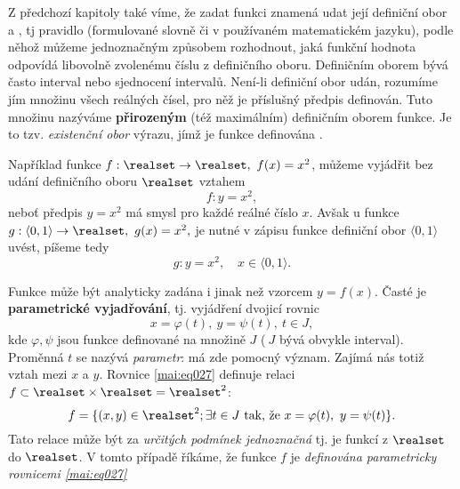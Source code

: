   
      Z předchozí kapitoly také víme, že zadat funkci znamená udat její definiční obor a 
      , tj pravidlo (formulované slovně či v používaném matematickém 
      jazyku), podle něhož můžeme jednoznačným způsobem rozhodnout, jaká funkční hodnota odpovídá 
      libovolně zvolenému číslu z definičního oboru. Definičním oborem bývá často interval nebo 
      sjednocení intervalů. Není-li definiční obor udán, rozumíme jím množinu všech reálných čísel, 
      pro něž je příslušný předpis definován. Tuto množinu nazýváme \textbf{přirozeným} (též 
      maximálním) definičním oborem funkce. Je to tzv. \emph{existenční obor} výrazu, jímž je 
      funkce definována \cite[s.~84]{Brabec1989}.
      
      Například funkce $f: \realset\rightarrow\realset,\ f(x)=x^2$, můžeme vyjádřit bez udání 
      definičního oboru $\realset$ vztahem 
      \begin{equation*}
        f: y=x^2,
      \end{equation*}
      neboť předpis $y=x^2$ má smysl pro každé reálné číslo $x$. Avšak u funkce $g:\langle0, 
      1\rangle\rightarrow\realset,\ g(x)=x^2,$ je nutné v zápisu funkce definiční obor $\langle0, 
      1\rangle$ 
      uvést, píšeme tedy   
      \begin{equation*}
        g: y=x^2, \quad x\in\langle0,1\rangle.
      \end{equation*}
       
        
      
        
      
      Funkce může být analyticky zadána i jinak než vzorcem $y=f(x)$. Časté je \textbf{parametrické 
      vyjadřování}, tj. vyjádření dvojicí rovnic 
      \begin{equation}\label{mai:eq027}
        x=\varphi(t),\ y=\psi(t),\ t\in J,
      \end{equation}
      kde $\varphi, \psi$ jsou funkce definované na množině $J$ ($\ J$ bývá obvykle interval). 
      Proměnná $t$ se nazývá \emph{parametr}: má zde pomocný význam. Zajímá nás totiž vztah mezi 
      $x$ a $y$. Rovnice \ref{mai:eq027} definuje relaci 
      $f\subset\realset\times\realset=\realset^2$:
      \begin{equation*}
        f = \{(x,y)\in\realset^2; \exists t\in J \text{ tak, že } x=\varphi(t),\ y=\psi(t)\}.
      \end{equation*}      
      Tato relace může být za \emph{určitých podmínek jednoznačná} tj. je funkcí z $\realset$ do 
      $\realset$. V tomto případě říkáme, že funkce $f$ je \emph{definována parametricky rovnicemi 
      \ref{mai:eq027}}
      

